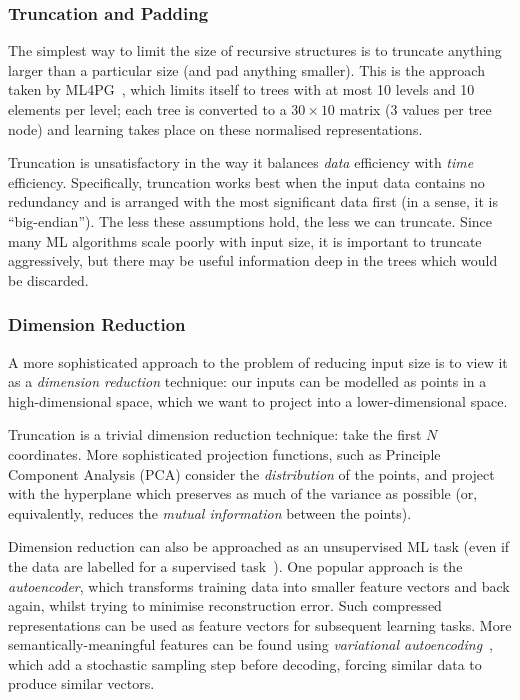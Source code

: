 \subsubsection{Truncation and Padding}

The simplest way to limit the size of recursive structures is to truncate
anything larger than a particular size (and pad anything smaller). This is the
approach taken by ML4PG~\cite{journals/corr/abs-1302-6421}, which limits itself
to trees with at most 10 levels and 10 elements per level; each tree is
converted to a $30 \times 10$ matrix (3 values per tree node) and learning
takes place on these normalised representations.

Truncation is unsatisfactory in the way it balances \emph{data} efficiency with
\emph{time} efficiency. Specifically, truncation works best when the input data
contains no redundancy and is arranged with the most significant data first (in
a sense, it is ``big-endian''). The less these assumptions hold, the less we can
truncate. Since many ML algorithms scale poorly with input size, it is important
to truncate aggressively, but there may be useful information deep in the trees
which would be discarded.

\subsubsection{Dimension Reduction}

A more sophisticated approach to the problem of reducing input size is to view
it as a \emph{dimension reduction} technique: our inputs can be modelled as
points in a high-dimensional space, which we want to project into a
lower-dimensional space.

Truncation is a trivial dimension reduction technique: take the first $N$
coordinates. More sophisticated projection functions, such as Principle
Component Analysis (PCA) consider the \emph{distribution} of the points, and
project with the hyperplane which preserves as much of the variance as possible
(or, equivalently, reduces the \emph{mutual information} between the points).

Dimension reduction can also be approached as an unsupervised ML task (even if
the data are labelled for a supervised
task~\cite{Oveisi.Oveisi.Erfanian.ea:2012}). One popular approach is the
\emph{autoencoder}, which transforms training data into smaller feature vectors
and back again, whilst trying to minimise reconstruction error. Such compressed
representations can be used as feature vectors for subsequent learning
tasks. More semantically-meaningful features can be found using
\emph{variational autoencoding}~\cite{kingma2013auto}, which add a stochastic
sampling step before decoding, forcing similar data to produce similar vectors.

